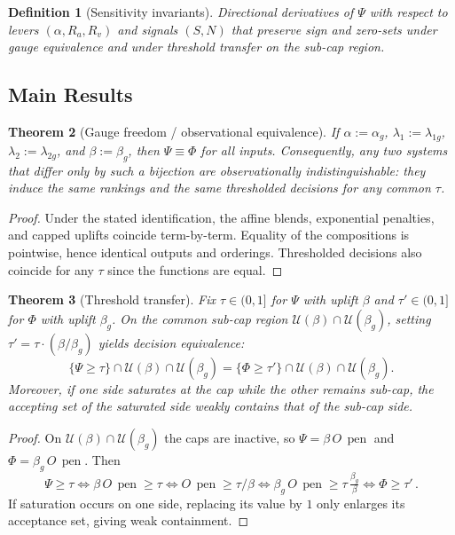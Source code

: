 \documentclass[12pt,a4paper]{article}
\newtheorem{theorem}{Theorem}
\newtheorem{definition}[theorem]{Definition}
\begin{document}
\begin{definition}[Sensitivity invariants]
Directional derivatives of $\Psi$ with respect to levers $(\alpha,R_a,R_v)$ and signals $(S,N)$ that preserve sign and zero-sets under gauge equivalence and under threshold transfer on the sub-cap region.
\end{definition}

\subsection{Main Results}
\begin{theorem}[Gauge freedom / observational equivalence]\label{thm:gauge-observational}
If $\alpha := \alpha_g$, $\lambda_1 := \lambda_{1g}$, $\lambda_2 := \lambda_{2g}$, and $\beta := \beta_g$, then $\Psi \equiv \Phi$ for all inputs. Consequently, any two systems that differ only by such a bijection are observationally indistinguishable: they induce the same rankings and the same thresholded decisions for any common $\tau$.
\end{theorem}
\begin{proof}
Under the stated identification, the affine blends, exponential penalties, and capped uplifts coincide term-by-term. Equality of the compositions is pointwise, hence identical outputs and orderings. Thresholded decisions also coincide for any $\tau$ since the functions are equal.
\end{proof}

\begin{theorem}[Threshold transfer]\label{thm:tt-expanded}
Fix $\tau\in(0,1]$ for $\Psi$ with uplift $\beta$ and $\tau'\in(0,1]$ for $\Phi$ with uplift $\beta_g$. On the common sub-cap region $\mathcal{U}(\beta)\cap\mathcal{U}(\beta_g)$, setting $\tau' = \tau\cdot (\beta/\beta_g)$ yields decision equivalence:
\[
\{\Psi \ge \tau\}\cap\mathcal{U}(\beta)\cap\mathcal{U}(\beta_g) = \{\Phi \ge \tau'\}\cap\mathcal{U}(\beta)\cap\mathcal{U}(\beta_g).
\]
Moreover, if one side saturates at the cap while the other remains sub-cap, the accepting set of the saturated side weakly contains that of the sub-cap side.
\end{theorem}
\begin{proof}
On $\mathcal{U}(\beta)\cap\mathcal{U}(\beta_g)$ the caps are inactive, so $\Psi = \beta\,O\,\operatorname{pen}$ and $\Phi = \beta_g\,O\,\operatorname{pen}$. Then
\[
\Psi \ge \tau \iff \beta\,O\,\operatorname{pen} \ge \tau \iff O\,\operatorname{pen} \ge \tau/\beta \iff \beta_g\,O\,\operatorname{pen} \ge \tau\,\tfrac{\beta_g}{\beta} \iff \Phi \ge \tau'\,.
\]
If saturation occurs on one side, replacing its value by $1$ only enlarges its acceptance set, giving weak containment.
\end{proof}
\end{document}
